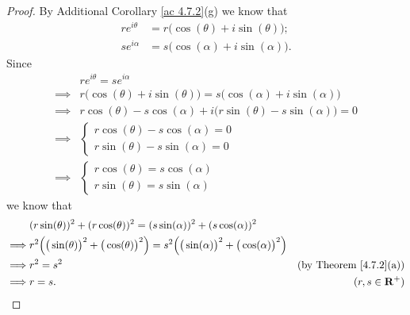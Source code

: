 \begin{proof}
    By Additional Corollary \ref{ac 4.7.2}(g) we know that
    \begin{align*}
        r e^{i \theta} & = r \big(\cos(\theta) + i \sin(\theta)\big); \\
        s e^{i \alpha} & = s \big(\cos(\alpha) + i \sin(\alpha)\big).
    \end{align*}
    Since
    \begin{align*}
                 & r e^{i \theta} = s e^{i \alpha}                                                       \\
        \implies & r \big(\cos(\theta) + i \sin(\theta)\big) = s \big(\cos(\alpha) + i \sin(\alpha)\big) \\
        \implies & r \cos(\theta) - s \cos(\alpha) + i \big(r \sin(\theta) - s \sin(\alpha)\big) = 0     \\
        \implies & \begin{cases}
            r \cos(\theta) - s \cos(\alpha) = 0 \\
            r \sin(\theta) - s \sin(\alpha) = 0
        \end{cases}                                                            \\
        \implies & \begin{cases}
            r \cos(\theta) = s \cos(\alpha) \\
            r \sin(\theta) = s \sin(\alpha)
        \end{cases}
    \end{align*}
    we know that
    \begin{align*}
                 & (r \sin(\theta))^2 + (r \cos(\theta))^2 = (s \sin(\alpha))^2 + (s \cos(\alpha))^2                                                                                          \\
        \implies & r^2 \Big(\big(\sin(\theta)\big)^2 + \big(\cos(\theta)\big)^2\Big) = s^2 \Big(\big(\sin(\alpha)\big)^2 + \big(\cos(\alpha)\big)^2\Big)                                      \\
        \implies & r^2 = s^2                                                                                                                             & \text{(by Theorem \ref{4.7.2}(a))} \\
        \implies & r = s.                                                                                                                                & (r, s \in \mathbf{R}^+)
    \end{align*}

\end{proof}
